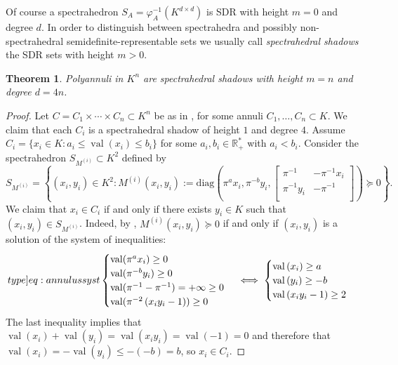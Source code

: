 \documentclass[a4paper,oneside,11pt]{article}
\newtheorem{theorem}{Theorem}[section]
\newcommand{\R}{\mathbb{R}} %
\DeclareMathOperator{\val}{val}
\def\diag{\mathrm{diag}}
\begin{document}
Of course a spectrahedron $S_A = \varphi_A^{-1}(K^{d \times d})$ is SDR with height $m=0$ and degree
$d$. In order to distinguish between spectrahedra and possibly non-spectrahedral semidefinite-representable sets
we usually call \emph{spectrahedral shadows} the SDR sets with height $m>0$.

\begin{theorem}
Polyannuli in $K^n$ are spectrahedral shadows with height $m=n$ and degree $d=4n$.
\end{theorem}
\begin{proof}
  Let $C = C_1 \times \cdots \times C_n \subset K^n$ be as in ,
  for some annuli $C_1,\ldots,C_n \subset K$. We claim that each $C_i$ is a spectrahedral
  shadow of height $1$ and degree $4$. Assume $C_i = \{x_i \in K : a_i \leq \val(x_i) \leq b_i\}$
  for some $a_i, b_i \in \R^*_+$ with $a_i < b_i$. Consider the spectrahedron
  $S_{M^{(i)}} \subset K^2$ defined by
  $$
  S_{M^{(i)}} = \left\{(x_i,y_i) \in K^2 :
  M^{(i)}(x_i,y_i) := \diag\left(\pi^a x_i, \pi^{-b} y_i,
  \begin{bmatrix}
    \pi^{-1} & -\pi^{-1} x_i  \\
    \pi^{-1} y_i & - \pi^{-1} \\
  \end{bmatrix}\right) \succeq 0
  \right\}.
  $$
  We claim that $x_i \in C_i$ if and only if there exists $y_i \in K$ such that $(x_i,y_i) \in S_{M^{(i)}}$.
  Indeed, by , $M^{(i)}(x_i,y_i) \succeq 0$ if and only if $(x_i,y_i)$ is a solution of the system
  of inequalities:
  \begin{equation}
    \label[type]{eq:annulussyst}
    \begin{cases}
      \val(\pi^a x_i) \ge 0 \\
  \val(\pi^{-b} y_i) \ge 0\\
  \val(\pi^{-1}- \pi^{-1}) = +\infty \ge 0\\
  \val(\pi^{-2}\left( x_iy_i-1 \right))  \ge 0 
\end{cases}
\iff	
\begin{cases} 
  \val\left(x_i\right)\ge a\\
  \val\left(y_i\right)\ge -b\\
  \val\left(x_iy_i-1 \right) \ge 2
\end{cases}
\end{equation}
  The last inequality implies that $\val\left(x_i\right)+\val\left(y_i\right)=\val\left(x_iy_i\right) = \val\left(-1\right) =0$ and therefore that $\val\left(x_i\right)=-\val\left(y_i\right)\le -(-b) = b$, so $x_i \in C_i$. 

\end{proof}
\end{document}
